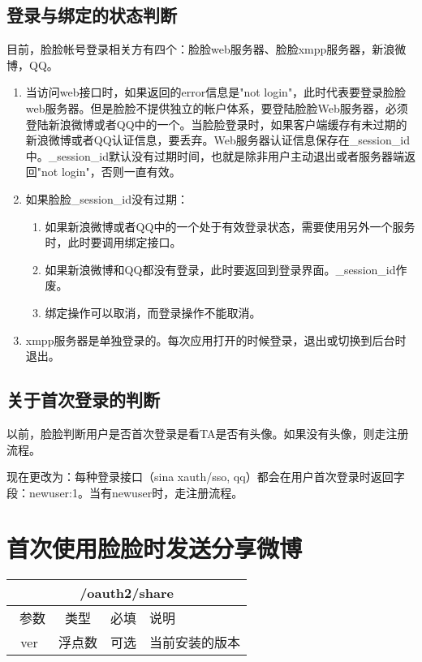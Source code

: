 \documentclass[cs4size]{ctexartutf8}
\begin{document}
\subsection{登录与绑定的状态判断}
目前，脸脸帐号登录相关方有四个：脸脸web服务器、脸脸xmpp服务器，新浪微博，QQ。

\begin{enumerate}

\item 当访问web接口时，如果返回的error信息是"not login"，此时代表要登录脸脸web服务器。但是脸脸不提供独立的帐户体系，要登陆脸脸Web服务器，必须登陆新浪微博或者QQ中的一个。当脸脸登录时，如果客户端缓存有未过期的新浪微博或者QQ认证信息，要丢弃。Web服务器认证信息保存在\_session\_id中。\_session\_id默认没有过期时间，也就是除非用户主动退出或者服务器端返回"not login"，否则一直有效。
\item 如果脸脸\_session\_id没有过期：
\begin{enumerate}

\item 如果新浪微博或者QQ中的一个处于有效登录状态，需要使用另外一个服务时，此时要调用绑定接口。
\item 如果新浪微博和QQ都没有登录，此时要返回到登录界面。\_session\_id作废。
\item 绑定操作可以取消，而登录操作不能取消。
\end{enumerate}

\item xmpp服务器是单独登录的。每次应用打开的时候登录，退出或切换到后台时退出。
\end{enumerate}


\subsection{关于首次登录的判断}
以前，脸脸判断用户是否首次登录是看TA是否有头像。如果没有头像，则走注册流程。

现在更改为：每种登录接口（sina xauth/sso, qq）都会在用户首次登录时返回字段：{newuser:1}。当有newuser时，走注册流程。



\section{首次使用脸脸时发送分享微博}

\begin{table}[H]
   \begin{center}
\begin{tabular}{|c|c|c|p{12cm}|}
\hline
\multicolumn{4}{|c|}{/oauth2/share} \\
\hline\hline
 \  参数  & 类型 & 必填 &  说明  \\
\hline
   ver  & 浮点数 & 可选 &  当前安装的版本\\
\hline
\end{tabular}
   \end{center}
\end{table}
\end{document}

